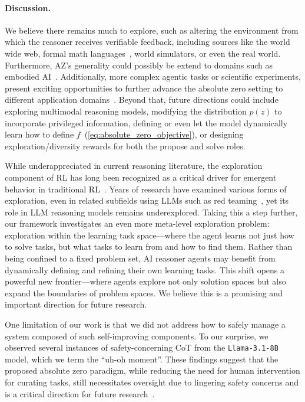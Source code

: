 \documentclass{article}
\begin{document}
\paragraph{Discussion.} We believe there remains much to explore, such as altering the environment from which the reasoner receives verifiable feedback, including sources like the world wide web, formal math languages~\cite{sutton2019keytoai,ren2025deepseekproverv2advancingformalmathematical}, world simulators, or even the real world. Furthermore, AZ's generality could possibly be extend to domains such as embodied AI~\citep{brohan2023rt,yue2024deer}. Additionally, more complex agentic tasks or scientific experiments, present exciting opportunities to further advance the absolute zero setting to different application domains~\citep{stateflow, autogen}. Beyond that, future directions could include exploring multimodal reasoning models, modifying the distribution \(p(z)\) to incorporate privileged information, defining or even let the model dynamically learn how to define \(f\)~(\cref{eq:absolute_zero_objective}), or designing exploration/diversity rewards for both the propose and solve roles.

While underappreciated in current reasoning literature, the exploration component of RL has long been recognized as a critical driver for emergent behavior in traditional RL~\citep{yue2025doesreinforcementlearningreally,silver2016mastering,Ladosz2022ExplorationID}. Years of research have examined various forms of exploration, even in related subfields using  LLMs such as red teaming~\cite{zhao2024diver}, yet its role in LLM reasoning models remains underexplored. Taking this a step further, our framework investigates an even more meta-level exploration problem: exploration within the learning task space—where the agent learns not just how to solve tasks, but what tasks to learn from and how to find them. Rather than being confined to a fixed problem set, AI reasoner agents may benefit from dynamically defining and refining their own learning tasks. This shift opens a powerful new frontier—where agents explore not only solution spaces but also expand the boundaries of problem spaces. We believe this is a promising and important direction for future research.

One limitation of our work is that we did not address how to safely manage a system composed of such self-improving components. To our surprise, we observed several instances of safety-concerning CoT from the \texttt{Llama-3.1-8B} model, which we term the ``uh-oh moment''. These findings suggest that the proposed absolute zero paradigm, while reducing the need for human intervention for curating tasks, still necessitates oversight due to lingering safety concerns and is a critical direction for future research~\cite{wang-etal-2024-boosting-llm, wang-etal-2025-model}.
\end{document}
